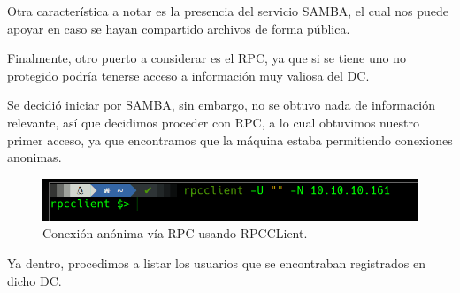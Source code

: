 \documentclass{article}
\begin{document}
Otra característica a notar es la presencia del servicio SAMBA, el cual nos puede apoyar en caso se hayan compartido archivos de forma pública. 

Finalmente, otro puerto a considerar es el RPC, ya que si se tiene uno no protegido podría tenerse acceso a información muy valiosa del DC.

Se decidió iniciar por SAMBA, sin embargo, no se obtuvo nada de información relevante, así que decidimos proceder con RPC, a lo cual obtuvimos nuestro primer acceso, ya que encontramos que la máquina estaba permitiendo conexiones anonimas.

\begin{figure}[H]
	\center
	\includegraphics[width=\textwidth/2]{images/forest/conexion_rpc.png}
	\caption{Conexión anónima vía RPC usando RPCCLient.}
\end{figure}

Ya dentro, procedimos a listar los usuarios que se encontraban registrados en dicho DC. 
\end{document}
